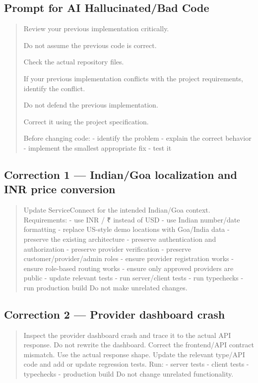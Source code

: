 \subsection*{Prompt for AI Hallucinated/Bad Code}

\begin{quote}
Review your previous implementation critically.

Do not assume the previous code is correct.

Check the actual repository files.

If your previous implementation conflicts with the project requirements,
identify the conflict.

Do not defend the previous implementation.

Correct it using the project specification.

Before changing code:
- identify the problem
- explain the correct behavior
- implement the smallest appropriate fix
- test it
\end{quote}

\subsection*{Correction 1 --- Indian/Goa localization and INR price conversion}

\begin{quote}
Update ServiceConnect for the intended Indian/Goa context.
Requirements:
- use INR / ₹ instead of USD
- use Indian number/date formatting
- replace US-style demo locations with Goa/India data
- preserve the existing architecture
- preserve authentication and authorization
- preserve provider verification
- preserve customer/provider/admin roles
- ensure provider registration works
- ensure role-based routing works
- ensure only approved providers are public
- update relevant tests
- run server/client tests
- run typechecks
- run production build
Do not make unrelated changes.
\end{quote}

\subsection*{Correction 2 --- Provider dashboard crash}

\begin{quote}
Inspect the provider dashboard crash and trace it to the actual API
response.
Do not rewrite the dashboard.
Correct the frontend/API contract mismatch.
Use the actual response shape.
Update the relevant type/API code and add or update regression tests.
Run:
- server tests
- client tests
- typechecks
- production build
Do not change unrelated functionality.
\end{quote}

